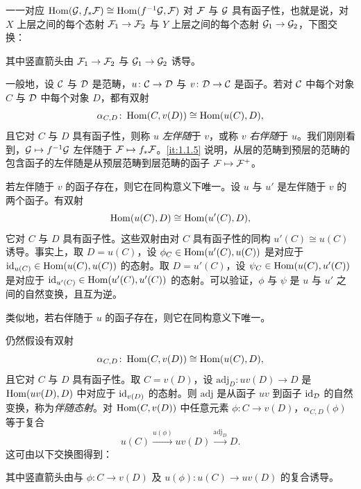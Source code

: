 一一对应 $\operatorname{Hom}(\mathcal{G},f_*\mathcal{F})\cong\operatorname{Hom}(f^{-1}\mathcal{G},\mathcal{F})$ 对 $\mathcal{F}$ 与 $\mathcal{G}$ 具有函子性，也就是说，对 $X$ 上层之间的每个态射 $\mathcal{F}_1\to\mathcal{F}_2$ 与 $Y$ 上层之间的每个态射 $\mathcal{G}_1\to\mathcal{G}_2$，下图交换：
\begin{center}
\end{center}
其中竖直箭头由 $\mathcal{F}_1\to\mathcal{F}_2$ 与 $\mathcal{G}_1\to\mathcal{G}_2$ 诱导。

一般地，设 $\mathcal{C}$ 与 $\mathcal{D}$ 是范畴，$u\colon\mathcal{C}\to\mathcal{D}$ 与 $v\colon\mathcal{D}\to\mathcal{C}$ 是函子。若对 $\mathcal{C}$ 中每个对象 $C$ 与 $\mathcal{D}$ 中每个对象 $D$，都有双射
\[
\alpha_{C,D}\colon\operatorname{Hom}(C,v(D))\cong\operatorname{Hom}(u(C),D),
\]
且它对 $C$ 与 $D$ 具有函子性，则称 $u$ \emph{左伴随}于 $v$，或称 $v$ \emph{右伴随}于 $u$。我们刚刚看到，$\mathcal{G}\mapsto f^{-1}\mathcal{G}$ 左伴随于 $\mathcal{F}\mapsto f_*\mathcal{F}$。\ref{it:1.1.5} 说明，从层的范畴到预层的范畴的包含函子的左伴随是从预层范畴到层范畴的函子 $\mathcal{F}\mapsto\mathcal{F}^+$。

若左伴随于 $v$ 的函子存在，则它在同构意义下唯一。设 $u$ 与 $u'$ 是左伴随于 $v$ 的两个函子。有双射
\[
\operatorname{Hom}(u(C),D)\cong\operatorname{Hom}(u'(C),D),
\]
它对 $C$ 与 $D$ 具有函子性。这些双射由对 $C$ 具有函子性的同构 $u'(C)\cong u(C)$ 诱导。事实上，取 $D=u(C)$，设 $\phi_C\in\operatorname{Hom}(u'(C),u(C))$ 是对应于 $\operatorname{id}_{u(C)}\in\operatorname{Hom}(u(C),u(C))$ 的态射。取 $D=u'(C)$，设 $\psi_C\in\operatorname{Hom}(u(C),u'(C))$ 是对应于 $\operatorname{id}_{u'(C)}\in\operatorname{Hom}(u'(C),u'(C))$ 的态射。可以验证，$\phi$ 与 $\psi$ 是 $u$ 与 $u'$ 之间的自然变换，且互为逆。

类似地，若右伴随于 $u$ 的函子存在，则它在同构意义下唯一。

仍然假设有双射
\[
\alpha_{C,D}\colon\operatorname{Hom}(C,v(D))\cong\operatorname{Hom}(u(C),D),
\]
且它对 $C$ 与 $D$ 具有函子性。取 $C=v(D)$，设 $\mathrm{adj}_D\colon uv(D)\to D$ 是 $\operatorname{Hom}(uv(D),D)$ 中对应于 $\operatorname{id}_{v(D)}$ 的态射。则 $\mathrm{adj}$ 是从函子 $uv$ 到函子 $\operatorname{id}_{\mathcal{D}}$ 的自然变换，称为\emph{伴随态射}。对 $\operatorname{Hom}(C,v(D))$ 中任意元素 $\phi\colon C\to v(D)$，$\alpha_{C,D}(\phi)$ 等于复合
\[
u(C)\xrightarrow{u(\phi)}uv(D)\xrightarrow{\mathrm{adj}_D}D.
\]
这可由以下交换图得到：
\begin{center}
\end{center}
其中竖直箭头由与 $\phi\colon C\to v(D)$ 及 $u(\phi)\colon u(C)\to uv(D)$ 的复合诱导。

